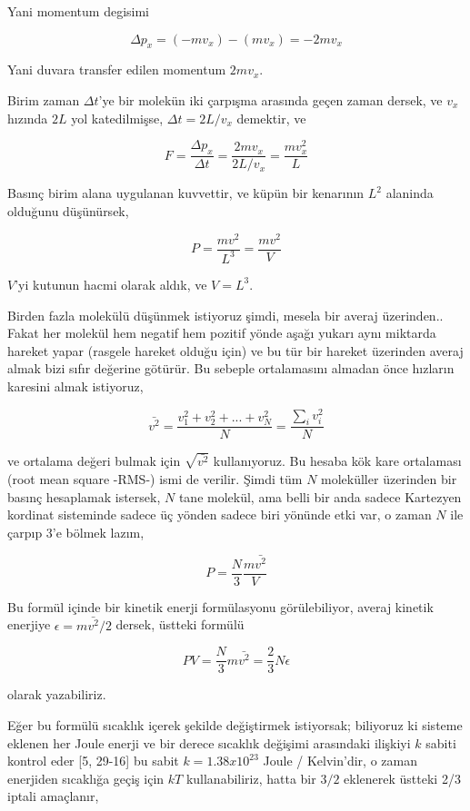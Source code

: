 \documentclass[12pt,fleqn]{article}\usepackage{../../common}
\begin{document}
Yani momentum degisimi

$$
\Delta p_x = (-m v_x) - (m v_x) = - 2 m v_x 
$$

Yani duvara transfer edilen momentum $2 m v_x$. 

Birim zaman $\Delta t$'ye bir molekün iki çarpışma arasında geçen zaman dersek,
ve $v_x$ hızında $2L$ yol katedilmişse, $\Delta t  = 2 L / v_x$ demektir, ve

$$
F = \frac{\Delta p_x}{\Delta t} = \frac{2 m v_x}{2 L / v_x} = \frac{m v_x^2}{L}
$$

Basınç birim alana uygulanan kuvvettir, ve küpün bir kenarının $L^2$ alaninda
olduğunu düşünürsek, 

$$
P = \frac{m v^2}{L^3} = \frac{m v^2}{V}
$$

$V$'yi kutunun hacmi olarak aldık, ve $V = L^3$.

Birden fazla molekülü düşünmek istiyoruz şimdi, mesela bir averaj
üzerinden.. Fakat her molekül hem negatif hem pozitif yönde aşağı yukarı aynı
miktarda hareket yapar (rasgele hareket olduğu için) ve bu tür bir hareket
üzerinden averaj almak bizi sıfır değerine götürür. Bu sebeple ortalamasını
almadan önce hızların karesini almak istiyoruz,

$$
\bar{v^2} = \frac{v_1^2 + v_2^2 + ... + v_N^2 }{N} = \frac{\sum_i v_i^2}{N}
$$

ve ortalama değeri bulmak için $\sqrt{\bar{v^2}}$ kullanıyoruz. Bu hesaba kök
kare ortalaması (root mean square -RMS-) ismi de verilir. Şimdi tüm $N$
moleküller üzerinden bir basınç hesaplamak istersek, $N$ tane molekül, ama belli
bir anda sadece Kartezyen kordinat sisteminde sadece üç yönden sadece biri
yönünde etki var, o zaman $N$ ile çarpıp 3'e bölmek lazım, 

$$
P = \frac{N}{3} \frac{m \bar{v^2}}{V}
$$

Bu formül içinde bir kinetik enerji formülasyonu görülebiliyor, averaj kinetik
enerjiye $\epsilon = m \bar{v^2} / 2$ dersek, üstteki formülü

$$
PV = \frac{N}{3} m \bar{v^2} = \frac{2}{3} N \epsilon
$$

olarak yazabiliriz.

Eğer bu formülü sıcaklık içerek şekilde değiştirmek istiyorsak; biliyoruz ki
sisteme eklenen her Joule enerji ve bir derece sıcaklık değişimi arasındaki
ilişkiyi $k$ sabiti kontrol eder [5, 29-16] bu sabit $k = 1.38 x 10^{23}$ Joule
/ Kelvin'dir, o zaman enerjiden sıcaklığa geçiş için $kT$ kullanabiliriz, hatta
bir $3/2$ eklenerek üstteki 2/3 iptali amaçlanır,
\end{document}
